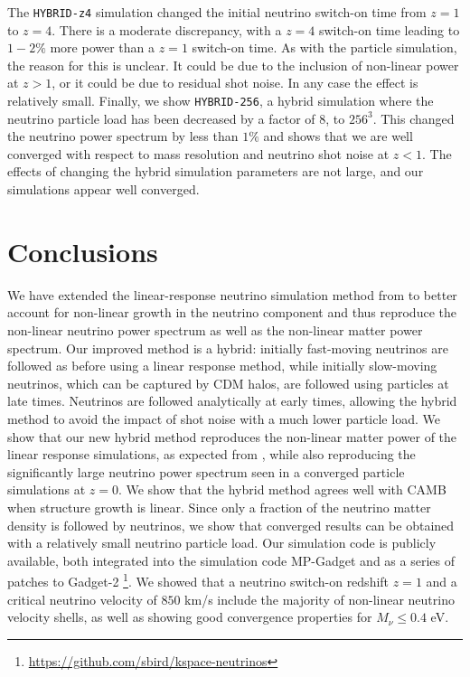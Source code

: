 \documentclass[useAMS, usenatbib]{mnras}
\begin{document}
The \texttt{HYBRID-z4} simulation changed the initial neutrino switch-on time from $z=1$ to $z=4$. There is a moderate discrepancy, with a $z=4$ switch-on time leading to $1-2\%$ more power than a $z=1$ switch-on time. As with the particle simulation, the reason for this is unclear. It could be due to the inclusion of non-linear power at $z>1$, or it could be due to residual shot noise. In any case the effect is relatively small. Finally, we show \texttt{HYBRID-256}, a hybrid simulation where the neutrino particle load has been decreased by a factor of $8$, to $256^3$. This changed the neutrino power spectrum by less than $1\%$ and shows that we are well converged with respect to mass resolution and neutrino shot noise at $z < 1$.
The effects of changing the hybrid simulation parameters are not large, and our simulations appear well converged.

\section{Conclusions}
\label{sec:conclusion}

We have extended the linear-response neutrino simulation method from \cite{AHB} to better account for non-linear growth in the neutrino component and thus reproduce the non-linear neutrino power spectrum as well as the non-linear matter power spectrum.
Our improved method is a hybrid: initially fast-moving neutrinos are followed as before using a linear response method, while initially slow-moving neutrinos, which can be captured by CDM halos, are followed using particles at late times. Neutrinos are followed analytically at early times, allowing the hybrid method to avoid the impact of shot noise with a much lower particle load. We show that our new hybrid method reproduces the non-linear matter power of the linear response simulations, as expected from \cite{AHB}, while also reproducing the significantly large neutrino power spectrum seen in a converged particle simulations at $z=0$. We show that the hybrid method agrees well with CAMB when structure growth is linear. Since only a fraction of the neutrino matter density is followed by neutrinos, we show that converged results can be obtained with a relatively small neutrino particle load. Our simulation code is publicly available, both integrated into the simulation code MP-Gadget and as a series of patches to Gadget-2 \footnote{\url{https://github.com/sbird/kspace-neutrinos}}. We showed that a neutrino switch-on redshift $z=1$ and a critical neutrino velocity of $850$ km/s include the majority of non-linear neutrino velocity shells, as well as showing good convergence properties for $M_\nu \leq 0.4$ eV.
\end{document}
